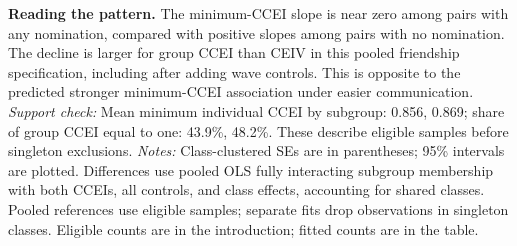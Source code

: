 \documentclass[11pt]{article}
\begin{document}
\textbf{Reading the pattern.} The minimum-CCEI slope is near zero among pairs with any nomination, compared with positive slopes among pairs with no nomination. The decline is larger for group CCEI than CEIV in this pooled friendship specification, including after adding wave controls. This is opposite to the predicted stronger minimum-CCEI association under easier communication.
\textit{Support check:} Mean minimum individual CCEI by subgroup: 0.856, 0.869; share of group CCEI equal to one: 43.9\%, 48.2\%. These describe eligible samples before singleton exclusions.
\textit{Notes:} Class-clustered SEs are in parentheses; 95\% intervals are plotted. Differences use pooled OLS fully interacting subgroup membership with both CCEIs, all controls, and class effects, accounting for shared classes. Pooled references use eligible samples; separate fits drop observations in singleton classes. Eligible counts are in the introduction; fitted counts are in the table.
\end{document}
